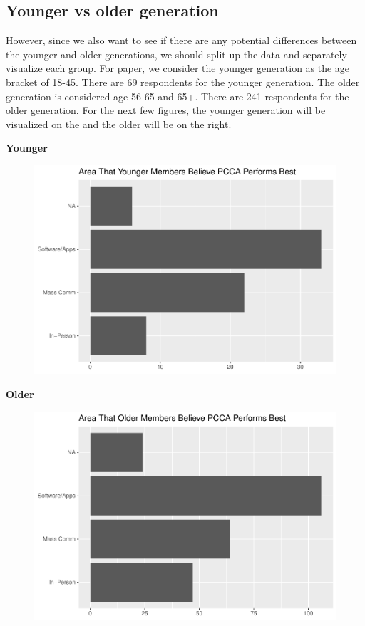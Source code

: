 \documentclass[a4paper]{article}
\begin{document}
\subsection{Younger vs older generation}
However, since we also want to see if there are any potential differences between the younger and older generations, we should split up the data and separately visualize each group. For paper, we consider the younger generation as the age bracket of 18-45. There are 69 respondents for the younger generation. The older generation is considered age 56-65 and 65+. There are 241 respondents for the older generation. For the next few figures, the younger generation will be visualized on the and the older will be on the right. \\

\noindent\begin{minipage}{0.5\textwidth}
	\centering\textbf{Younger}
	\begin{figure}[H]
		\includegraphics[scale=0.5]{survey/pcca_survey_files/figure-latex/best-young-1.pdf}
	\end{figure}
\end{minipage}%
\begin{minipage}{0.5\textwidth}
	\centering\textbf{Older}
	\begin{figure}[H]
		\includegraphics[scale=0.5]{survey/pcca_survey_files/figure-latex/best-old-1.pdf}
	\end{figure}
\end{minipage}
\end{document}
